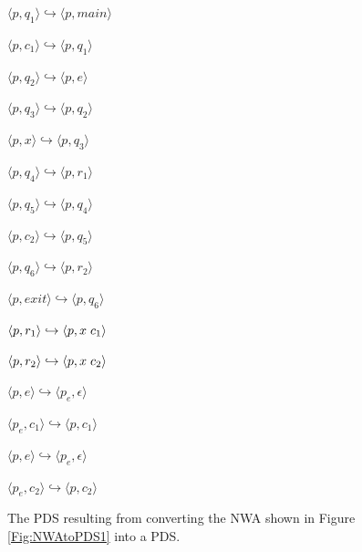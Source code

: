 \begin{figure}[htbp]
  \centering
    \begin{description}
      \centering
      \item{ $\langle p,q_1 \rangle \hookrightarrow \langle p,main \rangle$}
      \item{ $\langle p,c_1 \rangle \hookrightarrow \langle p,q_1 \rangle$}
      \item{ $\langle p,q_2 \rangle \hookrightarrow \langle p,e \rangle$}
      \item{ $\langle p,q_3 \rangle \hookrightarrow \langle p,q_2 \rangle$}
      \item{ $\langle p,x \rangle \hookrightarrow \langle p,q_3 \rangle$}
      \item{ $\langle p,q_4 \rangle \hookrightarrow \langle p,r_1 \rangle$}
      \item{ $\langle p,q_5 \rangle \hookrightarrow \langle p,q_4 \rangle$}
      \item{ $\langle p,c_2 \rangle \hookrightarrow \langle p,q_5 \rangle$}
      \item{ $\langle p,q_6 \rangle \hookrightarrow \langle p,r_2 \rangle$}
      \item{ $\langle p,exit \rangle \hookrightarrow \langle p,q_6 \rangle$}
      \item{ $\langle p,r_1 \rangle \hookrightarrow \langle p,x \hspace{.1cm} c_1 \rangle$}
      \item{ $\langle p,r_2 \rangle \hookrightarrow \langle p,x \hspace{.1cm} c_2 \rangle$}
      \item{ $\langle p,e \rangle \hookrightarrow \langle p_e, \epsilon \rangle$}
      \item{ $\langle p_e,c_1 \rangle \hookrightarrow \langle p,c_1 \rangle$}
      \item{ $\langle p,e \rangle \hookrightarrow \langle p_e, \epsilon \rangle$}
      \item{ $\langle p_e,c_2 \rangle \hookrightarrow \langle p,c_2 \rangle$}
    \end{description}
  \caption{The PDS resulting from converting the NWA shown in Figure
    \ref{Fig:NWAtoPDS1} into a PDS.}
  \label{Fig:NWAtoPDS3}
\end{figure}


